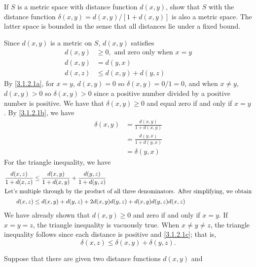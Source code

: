 \begin{exercise}[ref = \arabic{exercisei}]
\item
  \label{3.1.2.1}
  If \(S\) is a metric space with distance function \(d(x,y)\), show that \(S\)
  with the distance function \(\delta(x,y) = d(x,y)/[1 + d(x,y)]\) is also a
  metric space.
  The latter space is bounded in the sense that all distances lie under a fixed
  bound.
  \par\smallskip
  Since \(d(x,y)\) is a metric on \(S\), \(d(x,y)\) satisfies
  \begin{subequations}
    \begin{align}
      d(x, y) & \geq 0,\text{  and zero only when \(x = y\)}\label{3.1.2.1a}\\
      d(x, y) & = d(y, x)\label{3.1.2.1b}\\
      d(x, z) & \leq d(x, y) + d(y, z)\label{3.1.2.1c}
    \end{align}
  \end{subequations}
  By \cref{3.1.2.1a}, for \(x = y\), \(d(x,y) = 0\) so
  \(\delta(x,y) = 0/1 = 0\), and when \(x\neq y\), \(d(x,y) > 0\) so
  \(\delta(x,y) > 0\) since a positive number divided by a positive number is
  positive.
  We have that \(\delta(x,y)\geq 0\) and equal zero if and only if \(x = y\).
  By \cref{3.1.2.1b}, we have
  \begin{align*}
    \delta(x, y) & = \frac{d(x, y)}{1 + d(x, y)}\\
                 & = \frac{d(y, x)}{1 + d(y, x)}\\
                 & = \delta(y, x)
  \end{align*}
  For the triangle inequality, we have
  \begin{align*}
    \frac{d(x, z)}{1 + d(x, z)}
    & \leq \frac{d(x, y)}{1 + d(x, y)} + \frac{d(y, z)}{1 + d(y, z)}\\
    \intertext{Let's multiple through by the product of all three
    denominators.
    After simplifying, we obtain}
    d(x, z) & \leq d(x, y) + d(y,z) + 2d(x, y)d(y, z) + d(x, y)d(y, z)d(x, z)
  \end{align*}
  We have already shown that \(d(x,y)\geq 0\) and zero if and only if
  \(x = y\).
  If \(x = y = z\), the triangle inequality is vacuously true.
  When \(x\neq y\neq z\), the triangle inequality follows since each distance
  is positive and \cref{3.1.2.1c}; that is,
  \[
  \delta(x, z)\leq \delta(x, y) + \delta(y, z).
  \]
\item
  Suppose that there are given two distance functions \(d(x,y)\) and

\end{exercise}
